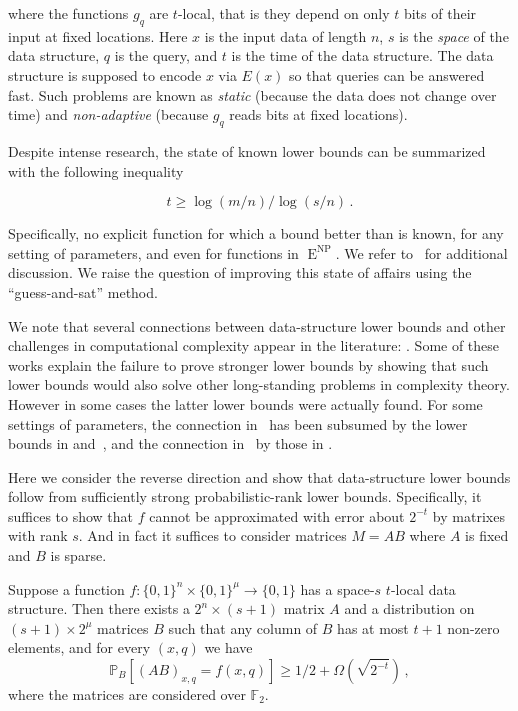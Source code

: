 \documentclass{toc}
\DeclareMathOperator{\NP}{\mathrm{NP}}  %
\DeclareMathOperator{\EEE}{\mathrm{E}}  %
\newcommand{\zo}{\{0, 1\}}
\newcommand{\F}{\mathbb{F}}
\renewcommand{\P}{\mathbb{P}}
\begin{document}
where the functions $g_{q}$ are $t$-local, that is they depend on
only $t$ bits of their input at fixed locations. Here $x$ is the
input data of length $n$, $s$ is the \emph{space} of the data structure,
$q$ is the query, and $t$ is the time of the data structure. The
data structure is supposed to encode $x$ via $E(x)$ so that queries
can be answered fast. Such problems are known as \emph{static }(because
the data does not change over time) and \emph{non-adaptive} (because
$g_{q}$ reads bits at fixed locations).

Despite intense research, the state of known lower bounds can be summarized
with the following inequality

\begin{equation}
t\ge\log(m/n)/\log(s/n)\,.\label{eq:dslb}
\end{equation}

Specifically, no explicit function for which a bound better than
is known, for any setting of parameters, and even for functions in
$\EEE^{\NP}$. We refer to~\cite{viola-datastructurelb-implies-cclb}
for additional discussion. We raise the question of improving this
state of affairs using the ``guess-and-sat'' method.

We note that several connections between data-structure lower bounds
and other challenges in computational complexity appear in the literature:
\cite{MiltersenNSW98,viola-datastructurelb-implies-cclb,DBLP:conf/stoc/DvirGW19,DBLP:journals/eccc/Corrigan-GibbsK18,DBLP:conf/innovations/RamamoorthyR20}.
Some of these works explain the failure to prove stronger lower bounds
by showing that such lower bounds would also solve other long-standing
problems in complexity theory. However in some cases the latter lower
bounds were actually found. For some settings of parameters, the connection
in~\cite{MiltersenNSW98} has been subsumed by the lower bounds in
\cite{Ajtai05} and~\cite{BSSV03}, and the connection in~\cite{DBLP:conf/stoc/DvirGW19}
by those in \cite{AlmanC19,DBLP:journals/corr/abs-2005-03123}.

Here we consider the reverse direction and show that data-structure
lower bounds follow from sufficiently strong probabilistic-rank lower
bounds. Specifically, it suffices to show that $f$ cannot be approximated
with error about $2^{-t}$ by matrixes with rank $s$. And in fact
it suffices to consider matrices $M=AB$ where $A$ is fixed and $B$
is sparse.
\begin{claim}
Suppose a function $f:\zo^{n}\times\zo^{\mu}\to\zo$ has a space-$s$
$t$-local data structure. Then there exists a $2^{n}\times(s+1)$
matrix $A$ and a distribution on $(s+1)\times2^{\mu}$ matrices $B$
such that any column of $B$ has at most $t+1$ non-zero elements,
and for every $(x,q)$ we have
\[
\P_{B}[(AB)_{x,q}=f(x,q)]\ge1/2+\Omega(\sqrt{2^{-t}})\,,
\]
where the matrices are considered over $\F_{2}$.
\end{claim}
\end{document}

